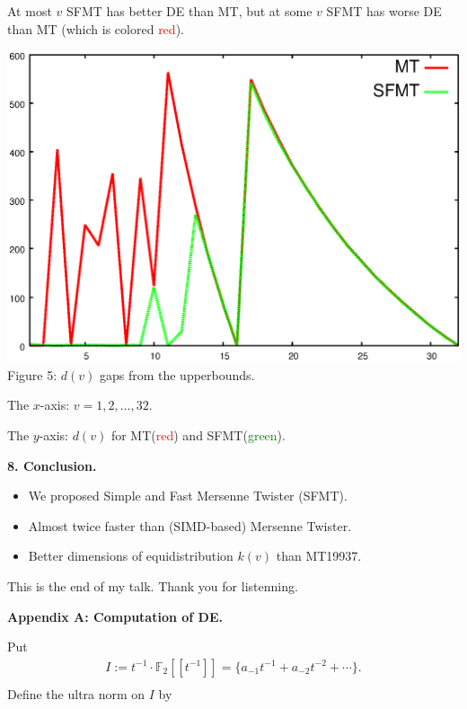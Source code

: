 \documentclass[a4j,12pt,landscape]{jarticle}
\def\F2{{\mathbb F}_2}
\begin{document}
At most $v$ SFMT has better DE than MT, but at some $v$ SFMT
 has worse DE than MT
(which is colored \textcolor{red}{red}).
\newpage
\begin{center}
\includegraphics[width=0.8\linewidth,height=0.7\textheight,
keepaspectratio]{delta.eps}
\\
Figure 5: $d(v)$ gaps from the upperbounds.

The $x$-axis: $v=1,2,\ldots, 32$.

The $y$-axis: $d(v)$ for 
MT(\textcolor{red}{red}) and SFMT(\textcolor{green}{green}).
\end{center}

\newpage
{\bf 8. Conclusion.}
\begin{itemize}
\item We proposed Simple and Fast Mersenne Twister (SFMT). 
\item Almost twice faster than (SIMD-based) Mersenne Twister.
\item Better dimensions of equidistribution $k(v)$ than MT19937. 

\end{itemize}
\vspace{\fill}
\begin{center}
This is the end of my talk. Thank you for listenning.
\end{center}
\vskip 1cm

\newpage
{\bf Appendix A: Computation of DE.}

Put
$$
\begin{array}{l}
I:=t^{-1}\cdot \F2[[t^{-1}]]
=\{a_{-1}t^{-1}+a_{-2}t^{-2}+\cdots \}
. \\
\end{array}
$$
Define the ultra norm on $I$ by 
\end{document}
